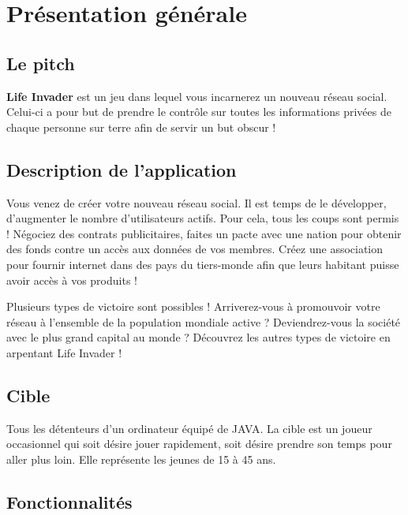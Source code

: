 \chapter{Présentation générale}
\label{chap:premierchapitre}

\section{Le pitch}
\textbf{Life Invader} est un jeu dans lequel vous incarnerez un nouveau réseau social. Celui-ci a pour but de prendre le contrôle sur toutes les informations privées de chaque personne sur terre afin de servir un but obscur !

\section{Description de l'application}

Vous venez de créer votre nouveau réseau social. Il est temps de le développer, d'augmenter le nombre d'utilisateurs actifs. Pour cela, tous les coups sont permis ! Négociez des contrats publicitaires, faites un pacte avec une nation pour obtenir des fonds contre un accès aux données de vos membres. Créez une association pour fournir internet dans des pays du tiers-monde afin que leurs habitant puisse avoir accès à vos produits !

Plusieurs types de victoire sont possibles ! Arriverez-vous à promouvoir votre réseau à l'ensemble de la population mondiale active ? Deviendrez-vous la société avec le plus grand capital au monde ? Découvrez les autres types de victoire en arpentant Life Invader !

\section{Cible}

Tous les détenteurs d'un ordinateur équipé de JAVA. La cible est un joueur occasionnel qui soit désire jouer rapidement, soit désire prendre son temps pour aller plus loin. Elle représente les jeunes de 15 à 45 ans.

\section{Fonctionnalités}

